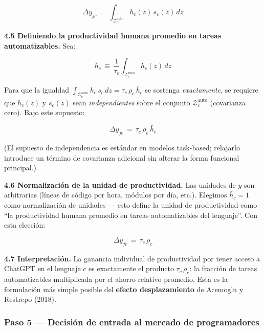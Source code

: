 \documentclass[11pt,a4paper]{article}
\theoremstyle{definition}
\begin{document}
\begin{equation}
\Delta y_{jc} \,=\, \int_{\mathcal{Z}_c^{\text{auto}}}\!\! h_c(z)\,s_c(z)\, dz
\label{eq:delta_y_hs}
\end{equation}

\textbf{4.5 Definiendo la productividad humana promedio en tareas automatizables.} Sea:

\begin{equation}
\bar{h}_c \,\equiv\, \frac{1}{\tau_c}\int_{\mathcal{Z}_c^{\text{auto}}}\!\! h_c(z)\,dz
\label{eq:hbar}
\end{equation}

Para que la igualdad $\int_{\mathcal{Z}_c^{\text{auto}}} h_c\,s_c\,dz = \tau_c\,\rho_c\,\bar{h}_c$ se sostenga \textit{exactamente}, se requiere que $h_c(z)$ y $s_c(z)$ sean \textit{independientes} sobre el conjunto $\mathcal{Z}_c^{\text{auto}}$ (covarianza cero). Bajo este supuesto:

\begin{equation}
\Delta y_{jc} \,=\, \tau_c\,\rho_c\,\bar{h}_c
\label{eq:paso4}
\end{equation}

(El supuesto de independencia es estándar en modelos task-based; relajarlo introduce un término de covarianza adicional sin alterar la forma funcional principal.)

\textbf{4.6 Normalización de la unidad de productividad.} Las unidades de $y$ son arbitrarias (líneas de código por hora, módulos por día, etc.). Elegimos $\bar{h}_c = 1$ como normalización de unidades --- esto define la unidad de productividad como ``la productividad humana promedio en tareas automatizables del lenguaje''. Con esta elección:

\begin{equation}
\boxed{\;\Delta y_{jc} \,=\, \tau_c\,\rho_c\;}
\label{eq:gananciaprod}
\end{equation}

\textbf{4.7 Interpretación.} La ganancia individual de productividad por tener acceso a ChatGPT en el lenguaje $c$ es exactamente el producto $\tau_c\,\rho_c$: la fracción de tareas automatizables multiplicada por el ahorro relativo promedio. Esta es la formulación más simple posible del \textbf{efecto desplazamiento} de Acemoglu y Restrepo (2018).

\subsubsection*{Paso 5 --- Decisión de entrada al mercado de programadores}
\end{document}
